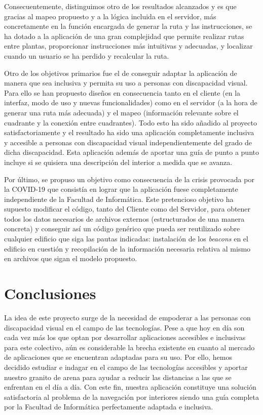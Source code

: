 Consecuentemente, distinguimos otro de los resultados alcanzados y es que gracias al mapeo propuesto y a la lógica incluida en el servidor, más concretamente en la función encargada de generar la ruta y las instrucciones, se ha dotado a la aplicación de una gran complejidad que permite realizar rutas entre plantas, proporcionar instrucciones más intuitivas y adecuadas, y localizar cuando un usuario se ha perdido y recalcular la ruta.

Otro de los objetivos primarios fue el de conseguir adaptar la aplicación de manera que sea inclusiva y permita su uso a personas con discapacidad visual. Para ello se han propuesto diseños en consecuencia tanto en el cliente (en la interfaz, modo de uso y nuevas funcionalidades) como en el servidor (a la hora de generar una ruta más adecuada) y el mapeo (información relevante sobre el cuadrante y la conexión entre cuadrantes). Todo esto ha sido añadido al proyecto satisfactoriamente y el resultado ha sido una aplicación completamente inclusiva y accesible a personas con discapacidad visual independientemente del grado de dicha discapacidad. Esta aplicación además de aportar una guía de punto a punto incluye si se quisiera una descripción del interior a medida que se avanza.

Por último, se propuso un objetivo como consecuencia de la crisis provocada por la COVID-19 que consistía en lograr que la aplicación fuese completamente independiente de la Facultad de Informática. Este pretencioso objetivo ha supuesto modificar el código, tanto del Cliente como del Servidor, para obtener todos los datos necesarios de archivos externos (estructurados de una manera concreta) y conseguir así un código genérico que pueda ser reutilizado sobre cualquier edificio que siga las pautas indicadas: instalación de los \textit{beacons} en el edificio en cuestión y recopilación de la información necesaria relativa al mismo en archivos que sigan el modelo propuesto.


\section{Conclusiones}
\label{sec:concluFinales}

La idea de este proyecto surge de la necesidad de empoderar a las personas con discapacidad visual en el campo de las tecnologías. Pese a que hoy en día son cada vez más los que optan por desarrollar aplicaciones accesibles e inclusivas para este colectivo, aún es considerable la brecha existente en cuanto al mercado de aplicaciones que se encuentran adaptadas para su uso. Por ello, hemos decidido estudiar e indagar en el campo de las tecnologías accesibles y aportar nuestro granito de arena para ayudar a reducir las distancias a las que se enfrentan en el día a día. Con este fin, nuestra aplicación constituye una solución satisfactoria al problema de la navegación por interiores siendo una guía completa por la Facultad de Informática perfectamente adaptada e inclusiva.

